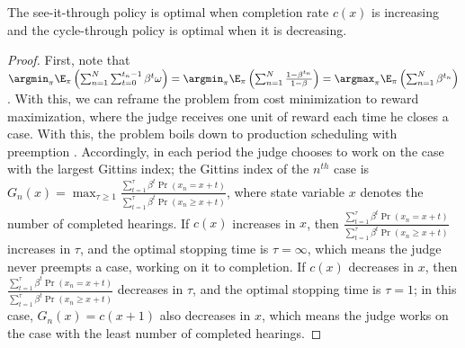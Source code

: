 	\begin{proposition}
		The see-it-through policy is optimal when completion rate $c(x)$ is increasing and the  cycle-through policy is optimal when it is decreasing.
	\end{proposition}
	\begin{proof}
		First, note that $ \argmin_\pi \E_\pi\left (\sum_{n=1}^{N}\sum_{t=0}^{t_n-1} \beta^t\omega \right ) = \argmin_\pi \E_\pi\left (\sum_{n=1}^{N} \frac{1-\beta^{t_n}}{1-\beta}\right)=\argmax_\pi  \E_\pi\left (\sum_{n=1}^{N} \beta^{t_n}\right)$. With this, we can reframe the problem from cost minimization to reward maximization, where the judge receives one unit of reward each time he closes a case. With this, the problem boils down to production scheduling with preemption \citep[p. 275]{Pinedo2012}. Accordingly, in each period the judge chooses to work on the case with the largest Gittins index; the Gittins index of the $ n^{th} $ case is $ G_n(x)=\max_{\tau\ge 1}\frac{\sum_{t=1}^{\tau}\beta^t \Pr(x_n=x+t)}{\sum_{t=1}^{\tau}\beta^t \Pr(x_n\ge x+t)} $, where state variable $ x $ denotes the number of completed hearings. If $c(x)$ increases in $ x $, then $ \frac{\sum_{t=1}^{\tau}\beta^t \Pr(x_n=x+t)}{\sum_{t=1}^{\tau}\beta^t \Pr(x_n\ge x+t)} $ increases in $ \tau $, and the optimal stopping time is $ \tau=\infty $, which means the judge never preempts a case, working on it to completion. If $c(x)$ decreases in $ x $, then $ \frac{\sum_{t=1}^{\tau}\beta^t \Pr(x_n=x+t)}{\sum_{t=1}^{\tau}\beta^t \Pr(x_n\ge x+t)} $ decreases in $ \tau $, and the optimal stopping time is $ \tau=1 $; in this case, $ G_n(x) = c(x+1)$ also decreases in $ x $, which means the judge works on the case with the least number of completed hearings.
	\end{proof}
	
	\clearpage
	\singlespacing
	
